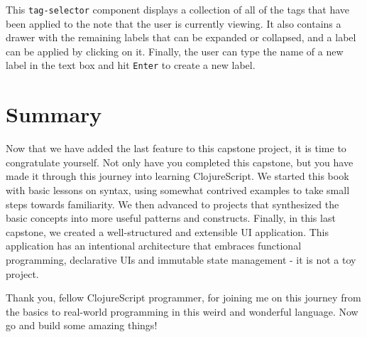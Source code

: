 \documentclass[10pt,twoside,openright]{memoir}
\begin{document}
This \texttt{tag-selector} component displays a collection of all of the
tags that have been applied to the note that the user is currently
viewing. It also contains a drawer with the remaining labels that can be
expanded or collapsed, and a label can be applied by clicking on it.
Finally, the user can type the name of a new label in the text box and
hit \texttt{Enter} to create a new label.

\section{Summary}

Now that we have added the last feature to this capstone project, it is
time to congratulate yourself. Not only have you completed this
capstone, but you have made it through this journey into learning
ClojureScript. We started this book with basic lessons on syntax, using
somewhat contrived examples to take small steps towards familiarity. We
then advanced to projects that synthesized the basic concepts into more
useful patterns and constructs. Finally, in this last capstone, we
created a well-structured and extensible UI application. This
application has an intentional architecture that embraces functional
programming, declarative UIs and immutable state management - it is not
a toy project.

Thank you, fellow ClojureScript programmer, for joining me on this
journey from the basics to real-world programming in this weird and
wonderful language. Now go and build some amazing things!

\cleardoublepage

\printindex

\newpage
\thispagestyle{empty}
\null
\end{document}
